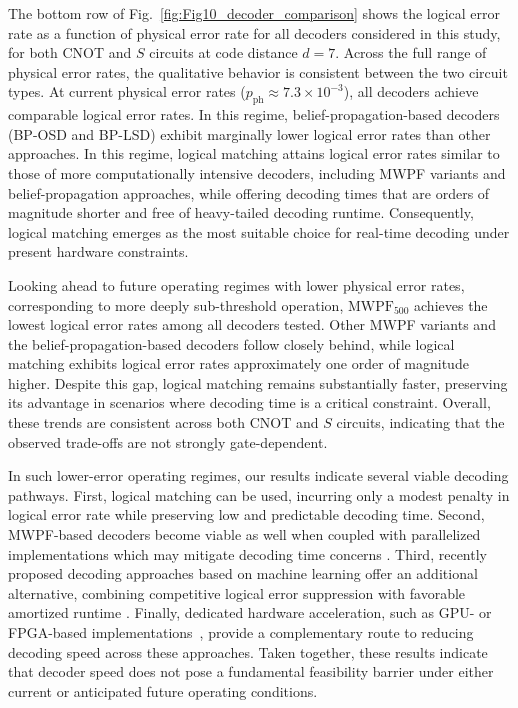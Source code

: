 \documentclass[aps, prx, reprint, superscriptaddress, longbibliography, floatfix]{revtex4-2}
\begin{document}
The bottom row of Fig.~\ref{fig:Fig10_decoder_comparison} shows the logical error rate as a function of physical error rate for all decoders considered in this study, for both CNOT and $S$ circuits at code distance $d=7$. Across the full range of physical error rates, the qualitative behavior is consistent between the two circuit types. At current physical error rates ($p_{\mathrm{ph}} \approx 7.3 \times 10^{-3}$), all decoders achieve comparable logical error rates. In this regime, belief-propagation-based decoders (BP-OSD and BP-LSD) exhibit marginally lower logical error rates than other approaches. In this regime, logical matching attains logical error rates similar to those of more computationally intensive decoders, including MWPF variants and belief-propagation approaches, while offering decoding times that are orders of magnitude shorter and free of heavy-tailed decoding runtime. Consequently, logical matching emerges as the most suitable choice for real-time decoding under present hardware constraints.

Looking ahead to future operating regimes with lower physical error rates, corresponding to more deeply sub-threshold operation, $\text{MWPF}_{500}$ achieves the lowest logical error rates among all decoders tested. Other MWPF variants and the belief-propagation-based decoders follow closely behind, while logical matching exhibits logical error rates approximately one order of magnitude higher. Despite this gap, logical matching remains substantially faster, preserving its advantage in scenarios where decoding time is a critical constraint. Overall, these trends are consistent across both CNOT and $S$ circuits, indicating that the observed trade-offs are not strongly gate-dependent.

 In such lower-error operating regimes, our results indicate several viable decoding pathways. First, logical matching can be used, incurring only a modest penalty in logical error rate while preserving low and predictable decoding time. Second, MWPF-based decoders become viable as well when coupled with parallelized implementations which may mitigate decoding time concerns \cite{mwpf_parrallel2024}. Third, recently proposed decoding approaches based on machine learning offer an additional alternative, combining competitive logical error suppression with favorable amortized runtime \cite{ML_decoder2025}. Finally, dedicated hardware acceleration, such as GPU- or FPGA-based implementations~\cite{Wu2023, Maurer2025}, provide a complementary route to reducing decoding speed across these approaches. Taken together, these results indicate that decoder speed does not pose a fundamental feasibility barrier under either current or anticipated future operating conditions. 
\end{document}
